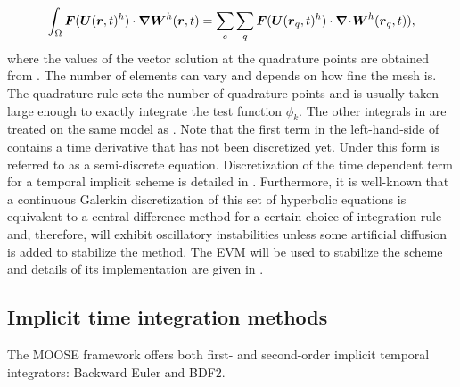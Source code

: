 %
\begin{align}\label{en:va_system_weak5}
\int_\Omega \boldsymbol F(\boldsymbol U(\boldsymbol r, t)^h) \cdot \boldsymbol{\nabla} \boldsymbol W^h(\boldsymbol r, t) = \sum_e \sum_q \boldsymbol F(\boldsymbol U(\boldsymbol r_q, t)^h) \cdot \boldsymbol{\nabla}\! \cdot \! \boldsymbol W^h (\boldsymbol r_q, t)),
\end{align}
%
where the values of the vector solution at the quadrature points are obtained from . The number of elements can vary and depends on how fine the mesh is. The quadrature rule sets the number of quadrature points and is usually taken large enough to exactly integrate the test function $\phi_k$. The other integrals in  are treated on the same model as . Note that the first term in the left-hand-side of   contains a time derivative that has not been discretized yet. Under this form  is referred to as a semi-discrete equation. Discretization of the time dependent term for a temporal implicit scheme is detailed in .
Furthermore, it is well-known
that a continuous Galerkin discretization of this set of hyperbolic
equations is equivalent to a central difference method for a certain
choice of integration rule and, therefore, will exhibit oscillatory
instabilities unless some artificial diffusion is added to stabilize
the method. The EVM will be used to stabilize the scheme and details of its implementation are given in .
\subsection{Implicit time integration methods}\label{sec:temp_implicit}
The MOOSE framework offers both first- and second-order implicit temporal integrators: Backward Euler and BDF2.
